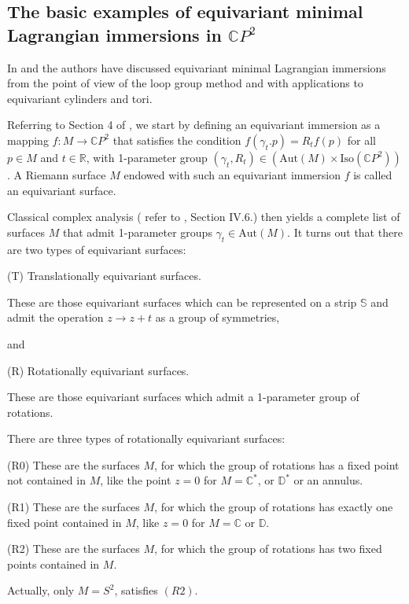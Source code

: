 \documentclass[a4paper,11pt]{amsart}
\theoremstyle{definition}
\numberwithin{equation}{section}
\newcommand{\C}{\mathbb{C}}
\newcommand{\D}{\mathbb{D}}
\newcommand{\St}{\mathbb{S}}
\begin{document}
\subsection{The basic examples of equivariant minimal Lagrangian immersions in \texorpdfstring{$\C P^2$}{}}
\label{subsec:6.1}

In \cite{DoMaNL} and \cite{DoMaEX} the authors have discussed equivariant 
minimal Lagrangian immersions from the point of view of the loop group method and with
applications to equivariant cylinders and tori.


Referring to Section 4 of \cite{DoMaEX}, we start by defining an equivariant immersion
 as a mapping $f: M \rightarrow \C P^2$ that satisfies the condition  $f(\gamma_t.p)= R_t f(p)$ for all $p\in M$ and $t\in \mathbb{R}$, with 1-parameter group $(\gamma_t, R_t) \in (\mathrm{Aut}(M)\times \mathrm{Iso}(\C P^2))$.
A Riemann surface $M$  endowed with such an equivariant immersion $f$ is called an equivariant surface. 
 
 
Classical complex analysis ( refer to \cite{Farkas-Kra}, Section IV.6.) then yields a complete list of surfaces $M$ that admit  1-parameter groups $\gamma_t\in \mathrm{Aut}(M)$.
 It turns out that there are two types of equivariant surfaces:
 
 (T)  Translationally equivariant surfaces.
 
  These are  those equivariant surfaces which can be represented on  a strip $\St$ and admit the operation
  $z \rightarrow  z + t$ as a group of symmetries,
  
  and 
  
  (R)  Rotationally equivariant surfaces.
  
  These are  those equivariant surfaces which admit  a 1-parameter group of rotations.
  
  There are three types of rotationally equivariant surfaces:
  
  (R0) These are the surfaces $M$, for which the group of rotations has a fixed point not contained in $M$, 
  like the point $z = 0$ for $ M =\C^*$, or $\D^*$ or an annulus.
  
  (R1)  These are the surfaces $M$, for which the group of rotations has exactly one fixed point  contained in $M$, like $z = 0$ for $M = \C$ or  $\D$.
  
  (R2) These are the surfaces $M$, for which the group of rotations has two fixed points  contained in $M.$
  
  Actually, only $M = S^2$, satisfies $(R2)$.
\end{document}

